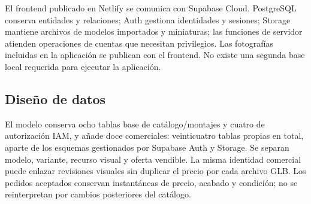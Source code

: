 \documentclass[12pt,letterpaper]{article}
\begin{document}
El frontend publicado en Netlify se comunica con Supabase Cloud. PostgreSQL conserva entidades y relaciones; Auth gestiona identidades y sesiones; Storage mantiene archivos de modelos importados y miniaturas; las funciones de servidor atienden operaciones de cuentas que necesitan privilegios. Las fotografías incluidas en la aplicación se publican con el frontend. No existe una segunda base local requerida para ejecutar la aplicación.

\subsection{Diseño de datos}
El modelo conserva ocho tablas base de catálogo/montajes y cuatro de autorización IAM, y añade doce comerciales: veinticuatro tablas propias en total, aparte de los esquemas gestionados por Supabase Auth y Storage. Se separan modelo, variante, recurso visual y oferta vendible. La misma identidad comercial puede enlazar revisiones visuales sin duplicar el precio por cada archivo GLB. Los pedidos aceptados conservan instantáneas de precio, acabado y condición; no se reinterpretan por cambios posteriores del catálogo.
\end{document}
